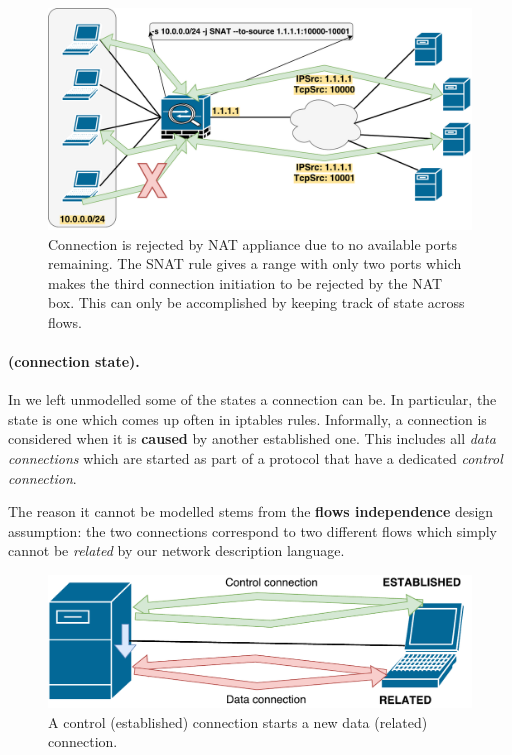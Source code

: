 \begin{figure}[h]
  \centering
  \captionsetup{justification=centering}
  \includegraphics[scale=0.5]{src/img/nat-global-state}
  \caption[Connection is rejected by NAT appliance due to no available ports
  remaining.]{Connection is rejected by NAT appliance due to no available ports
  remaining. The SNAT rule gives a range with only two ports which makes the
  third connection initiation to be rejected by the NAT box.  This can only be
  accomplished by keeping track of state across flows.}
  \label{fig:nat-global-state}
\end{figure}

\paragraph{\RELATED (connection state).}
In  we left unmodelled some of the
states a connection can be.  In particular, the \RELATED state is one which
comes up often in iptables rules.  Informally, a connection is considered
\RELATED when it is \textbf{caused} by another established one.  This includes
all \emph{data connections} which are started as part of a protocol that have a
dedicated \emph{control connection}.

The reason it cannot be modelled stems from the \textbf{flows independence}
design assumption: the two connections correspond to two different flows which
simply cannot be \emph{related} by our network description language.

\begin{figure}[h]
  \centering
  \captionsetup{justification=centering}
  \includegraphics[scale=0.5]{src/img/related-state}
  \caption{A control (established) connection starts a new data (related)
  connection.}
  \label{fig:related-state}
\end{figure}

